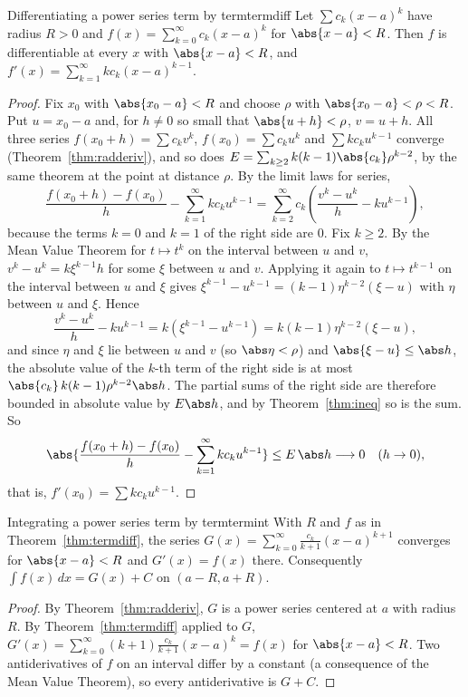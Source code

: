 \documentclass[11pt]{article}
\begin{document}
\begin{thm}{Differentiating a power series term by term}{termdiff}
Let $\sum c_k(x-a)^k$ have radius $R>0$ and $f(x)=\sum_{k=0}^\infty c_k(x-a)^k$ for $\abs{x-a}<R$. Then $f$ is differentiable at every $x$ with $\abs{x-a}<R$, and $f'(x)=\sum_{k=1}^\infty kc_k(x-a)^{k-1}$.
\end{thm}
\begin{proof}
Fix $x_0$ with $\abs{x_0-a}<R$ and choose $\rho$ with $\abs{x_0-a}<\rho<R$. Put $u=x_0-a$ and, for $h\ne0$ so small that $\abs{u+h}<\rho$, $v=u+h$. All three series $f(x_0+h)=\sum c_kv^k$, $f(x_0)=\sum c_ku^k$ and $\sum kc_ku^{k-1}$ converge (Theorem~\ref{thm:radderiv}), and so does $E=\sum_{k\ge2}k(k-1)\abs{c_k}\rho^{k-2}$, by the same theorem at the point at distance $\rho$. By the limit laws for series,
\[
\frac{f(x_0+h)-f(x_0)}h-\sum_{k=1}^\infty kc_ku^{k-1}=\sum_{k=2}^\infty c_k\left(\frac{v^k-u^k}h-ku^{k-1}\right),
\]
because the terms $k=0$ and $k=1$ of the right side are $0$. Fix $k\ge2$. By the Mean Value Theorem for $t\mapsto t^k$ on the interval between $u$ and $v$, $v^k-u^k=k\xi^{k-1}h$ for some $\xi$ between $u$ and $v$. Applying it again to $t\mapsto t^{k-1}$ on the interval between $u$ and $\xi$ gives $\xi^{k-1}-u^{k-1}=(k-1)\eta^{k-2}(\xi-u)$ with $\eta$ between $u$ and $\xi$. Hence
\[
\frac{v^k-u^k}h-ku^{k-1}=k\left(\xi^{k-1}-u^{k-1}\right)=k(k-1)\eta^{k-2}(\xi-u),
\]
and since $\eta$ and $\xi$ lie between $u$ and $v$ (so $\abs\eta<\rho$) and $\abs{\xi-u}\le\abs h$, the absolute value of the $k$-th term of the right side is at most $\abs{c_k}\,k(k-1)\rho^{k-2}\abs h$. The partial sums of the right side are therefore bounded in absolute value by $E\abs h$, and by Theorem~\ref{thm:ineq} so is the sum. So
\[
\abs{\frac{f(x_0+h)-f(x_0)}h-\sum_{k=1}^\infty kc_ku^{k-1}}\le E\,\abs h\longrightarrow0\quad(h\to0),
\]
that is, $f'(x_0)=\sum kc_ku^{k-1}$.
\end{proof}

\begin{thm}{Integrating a power series term by term}{termint}
With $R$ and $f$ as in Theorem~\ref{thm:termdiff}, the series $G(x)=\sum_{k=0}^\infty\frac{c_k}{k+1}(x-a)^{k+1}$ converges for $\abs{x-a}<R$ and $G'(x)=f(x)$ there. Consequently $\int f(x)\,dx=G(x)+C$ on $(a-R,a+R)$.
\end{thm}
\begin{proof}
By Theorem~\ref{thm:radderiv}, $G$ is a power series centered at $a$ with radius $R$. By Theorem~\ref{thm:termdiff} applied to $G$, $G'(x)=\sum_{k=0}^\infty(k+1)\frac{c_k}{k+1}(x-a)^k=f(x)$ for $\abs{x-a}<R$. Two antiderivatives of $f$ on an interval differ by a constant (a consequence of the Mean Value Theorem), so every antiderivative is $G+C$.
\end{proof}
\end{document}
